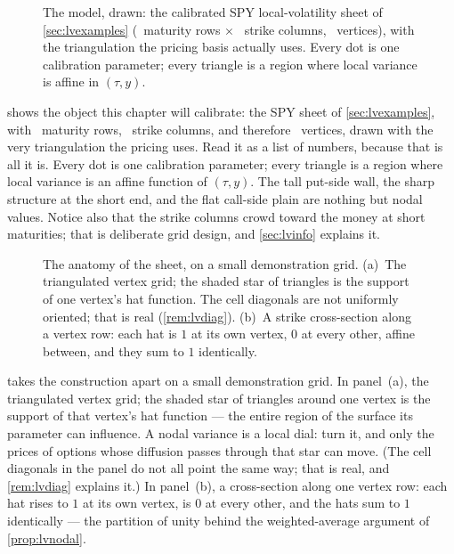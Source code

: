 \begin{figure}[htbp]
\centering
{}
\caption{The model, drawn: the calibrated SPY local-volatility sheet of
\cref{sec:lvexamples} (\MacLvSheetRows\ maturity rows $\times$
\MacLvSheetCols\ strike columns, \MacLvSheetVtx\ vertices), with the
triangulation the pricing basis actually uses.  Every dot is one
calibration parameter; every triangle is a region where local variance
is affine in $(\tau,y)$.}
\label{fig:lvsheet}
\end{figure}

 shows the object this chapter will calibrate: the
SPY sheet of \cref{sec:lvexamples}, with \MacLvSheetRows\ maturity
rows, \MacLvSheetCols\ strike columns, and therefore \MacLvSheetVtx\
vertices, drawn with the very triangulation the pricing uses.  Read it
as a list of numbers, because that is all it is.  Every dot is one
calibration parameter; every triangle is a region where local variance
is an affine function of $(\tau,y)$.  The tall put-side wall, the
sharp structure at the short end, and the flat call-side plain are
nothing but nodal values.  Notice also that the strike columns crowd
toward the money at short maturities; that is deliberate grid design,
and \cref{sec:lvinfo} explains it.

\begin{figure}[htbp]
\centering
{}
\caption{The anatomy of the sheet, on a small demonstration grid.
(a)~The triangulated vertex grid; the shaded star of triangles is the
support of one vertex's hat function.  The cell diagonals are not
uniformly oriented; that is real (\cref{rem:lvdiag}).  (b)~A strike
cross-section along a vertex row: each hat is $1$ at its own vertex,
$0$ at every other, affine between, and they sum to $1$ identically.}
\label{fig:lvbasis}
\end{figure}

 takes the construction apart on a small
demonstration grid.  In panel~(a), the triangulated vertex grid; the
shaded star of triangles around one vertex is the support of that
vertex's hat function --- the entire region of the surface its
parameter can influence.  A nodal variance is a local dial: turn it,
and only the prices of options whose diffusion passes through that
star can move.  (The cell diagonals in the panel do not all point the
same way; that is real, and \cref{rem:lvdiag} explains it.)  In
panel~(b), a cross-section along one vertex row: each hat rises to $1$
at its own vertex, is $0$ at every other, and the hats sum to $1$
identically --- the partition of unity behind the weighted-average
argument of \cref{prop:lvnodal}.

